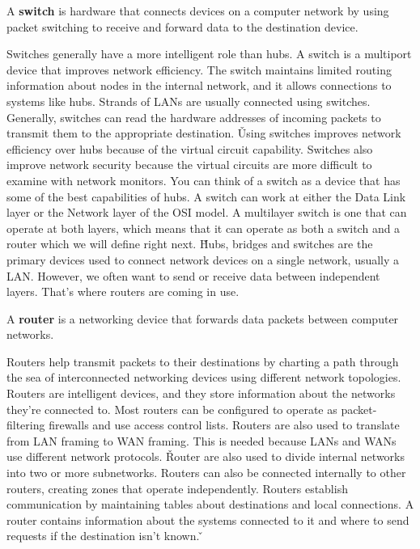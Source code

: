 \bd[Switch]
A \textbf{switch} is hardware that connects devices on a computer network by using packet switching to receive and
forward data to the destination device.
\ed


Switches generally have a more intelligent role than hubs. A switch is a multiport device that improves network
efficiency. The switch maintains limited routing information about nodes in the internal network, and it allows
connections to systems like hubs. Strands of LANs are usually connected using switches. Generally, switches can read
the hardware addresses of incoming packets to transmit them to the appropriate destination. \v

Using switches improves network efficiency over hubs because of the virtual circuit capability. Switches also improve
network security because the virtual circuits are more difficult to examine with network monitors. You can think of a
switch as a device that has some of the best capabilities of hubs. A switch can work at either the Data Link layer or
the Network layer of the OSI model. A multilayer switch is one that can operate at both layers, which means that it
can operate as both a switch and a router which we will define right next. \v

Hubs, bridges and switches are the primary devices used to connect network devices on a single network, usually a LAN.
However, we often want to send or receive data between independent layers. That's where routers are coming in use.

\bd[Router]
A \textbf{router} is a networking device that forwards data packets between computer networks.
\ed


Routers help transmit packets to their destinations by charting a path through the sea of interconnected networking
devices using different network topologies. Routers are intelligent devices, and they store information about the
networks they're connected to. Most routers can be configured to operate as packet-filtering firewalls and use access
control lists. Routers are also used to translate from LAN framing to WAN framing. This is needed because LANs and
WANs use different network protocols. \v

Router are also used to divide internal networks into two or more subnetworks. Routers can also be connected
internally to other routers, creating zones that operate independently. Routers establish communication by
maintaining tables about destinations and local connections. A router contains information about the systems
connected to it and where to send requests if the destination isn't known. \v

